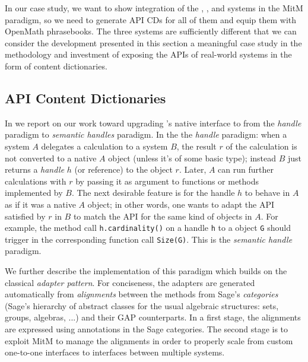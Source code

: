 In our case study, we want to show integration of the \GAP, \Singular, and \Sage systems
in the MitM paradigm, so we need to generate API CDs for all of them and equip them with
OpenMath phrasebooks. The three systems are sufficiently different that we can consider
the development presented in this section a meaningful case study in the methodology and
investment of exposing the APIs of real-world systems in the form of \OMMT content
dictionaries.

\subsection{\Sage API Content Dictionaries}

In \cite{DehKohKon:iop16} we report on our work toward upgrading
\Sage's native interface to \GAP from the \emph{handle} paradigm to
\emph{semantic handles} paradigm. In the the \emph{handle} paradigm:
when a system $A$ delegates a calculation to a system $B$, the result
$r$ of the calculation is not converted to a native $A$ object (unless
it's of some basic type);
instead $B$ just returns a \emph{handle} $h$ (or reference) to the
object $r$. Later, $A$ can run further calculations with $r$ by
passing it as argument to functions or methods implemented by $B$. The
next desirable feature is for the handle $h$ to behave in $A$ as if it
was a native $A$ object; in other words, one wants to adapt the API
satisfied by $r$ in $B$ to match the API for the same kind of objects
in $A$. For example, the method call \texttt{h.cardinality()} on a
\Sage handle \texttt{h} to a \GAP object \texttt{G} should trigger in
\GAP the corresponding function call \texttt{Size(G)}. This is the
\emph{semantic handle} paradigm.

We further describe the implementation of this paradigm which builds
on the classical \emph{adapter pattern}. For conciseness, the adapters
are generated automatically from \emph{alignments} between the methods
from Sage's \emph{categories} (Sage's hierarchy of abstract classes
for the usual algebraic structures: sets, groups, algebras, ...) and
their GAP counterparts. In a first stage, the alignments are expressed
using annotations in the Sage categories. The second stage is to
exploit MitM to manage the alignments in order to properly scale from
custom one-to-one interfaces to interfaces between multiple systems.

